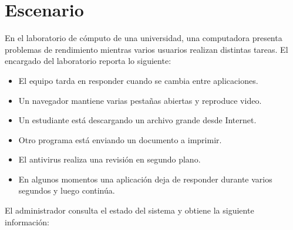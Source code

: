 \documentclass[
  spanish,
  letterpaper,
]{scrbook}
\providecommand{\tightlist}{%
  \setlength{\itemsep}{0pt}\setlength{\parskip}{0pt}}
\begin{document}
\section{Escenario}\label{escenario-1}

En el laboratorio de cómputo de una universidad, una computadora
presenta problemas de rendimiento mientras varios usuarios realizan
distintas tareas. El encargado del laboratorio reporta lo siguiente:

\begin{itemize}
\tightlist
\item
  El equipo tarda en responder cuando se cambia entre aplicaciones.
\item
  Un navegador mantiene varias pestañas abiertas y reproduce video.
\item
  Un estudiante está descargando un archivo grande desde Internet.
\item
  Otro programa está enviando un documento a imprimir.
\item
  El antivirus realiza una revisión en segundo plano.
\item
  En algunos momentos una aplicación deja de responder durante varios
  segundos y luego continúa.
\end{itemize}

El administrador consulta el estado del sistema y obtiene la siguiente
información:
\end{document}
